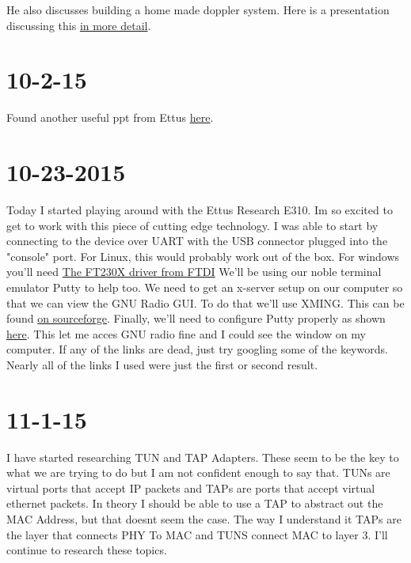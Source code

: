 \documentclass{article}
\begin{document}
	He also discusses building a home made doppler system. Here is a presentation discussing this \href{http://static1.1.sqspcdn.com/static/f/679473/21303404/1355863220773/seeber-DirectionFinding.pdf?token=5JaIYIRnVDZKyXjyXksT%2B3xSZ8o%3D}{in more detail}.

	\section{10-2-15}

	Found another useful ppt from Ettus \href{https://archive.fosdem.org/2014/schedule/event/tutorial_ofdm_packet_transceivers/attachments/slides/383/export/events/attachments/tutorial_ofdm_packet_transceivers/slides/383/MartinBraun_GNURadio_OFDM.pdf}{here}.


		\section{10-23-2015}
		Today I started playing around with the Ettus Research E310. Im so excited to get to work with this
		piece of cutting edge technology. I was able to start by connecting to the device over 
		UART with the USB connector plugged into the "console" port. For Linux, this would probably work
		out of the box. For windows you'll need \href{www.ftdichip.com/Products/ICs/FT230X.html}{The FT230X driver from FTDI}
		We'll be using our noble terminal emulator Putty to help too. We need to get an x-server setup
		on our computer so that we can view the GNU Radio GUI. To do that we'll use XMING. This can be
		found \href{sourceforge.net/projects/xming}{on sourceforge}. Finally, we'll need to configure
		Putty properly as shown \href{wiki.utdallas.edu/wiki/display/FAQ/X11+Forwarding+using+Xming+and+PuTTY}{here}. 
		This let me acces GNU radio fine and I could see the window on my computer. If any of the links
		are dead, just try googling some of the keywords. Nearly all of the links I used were just
		the first or second result. 

	\section{11-1-15}
	I have started researching TUN and TAP Adapters. These seem to be the key to what we are trying to do but I am not confident enough to say that. TUNs are virtual ports that
	accept IP packets and TAPs are ports that accept virtual ethernet packets. In theory I should be able to use a TAP to abstract out the MAC Address, but that doesnt seem the case. 
	The way I understand it TAPs are the layer that connects PHY To MAC and TUNS connect MAC to layer 3. I'll continue to research these topics.
\end{document}
